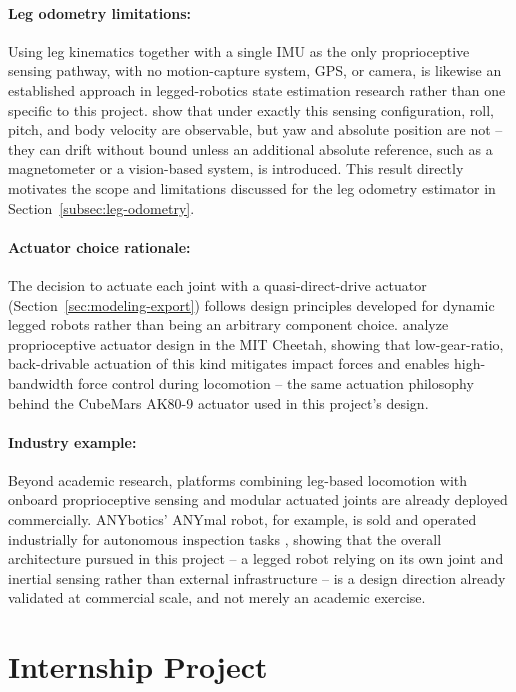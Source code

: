 \documentclass[12pt]{article}
\begin{document}
\paragraph{Leg odometry limitations:} Using leg kinematics together with a single IMU as the only proprioceptive sensing pathway, with no motion-capture system, GPS, or camera, is likewise an established approach in legged-robotics state estimation research rather than one specific to this project. \citet{bloesch2012state} show that under exactly this sensing configuration, roll, pitch, and body velocity are observable, but yaw and absolute position are not -- they can drift without bound unless an additional absolute reference, such as a magnetometer or a vision-based system, is introduced. This result directly motivates the scope and limitations discussed for the leg odometry estimator in Section~\ref{subsec:leg-odometry}.

\paragraph{Actuator choice rationale:} The decision to actuate each joint with a quasi-direct-drive actuator (Section~\ref{sec:modeling-export}) follows design principles developed for dynamic legged robots rather than being an arbitrary component choice. \citet{wensing2017proprioceptive} analyze proprioceptive actuator design in the MIT Cheetah, showing that low-gear-ratio, back-drivable actuation of this kind mitigates impact forces and enables high-bandwidth force control during locomotion -- the same actuation philosophy behind the CubeMars AK80-9 actuator used in this project's design.

\paragraph{Industry example:} Beyond academic research, platforms combining leg-based locomotion with onboard proprioceptive sensing and modular actuated joints are already deployed commercially. ANYbotics' ANYmal robot, for example, is sold and operated industrially for autonomous inspection tasks \citep{anybotics2026anymal}, showing that the overall architecture pursued in this project -- a legged robot relying on its own joint and inertial sensing rather than external infrastructure -- is a design direction already validated at commercial scale, and not merely an academic exercise.

\section{Internship Project}
\label{sec:internship-project}
\end{document}
